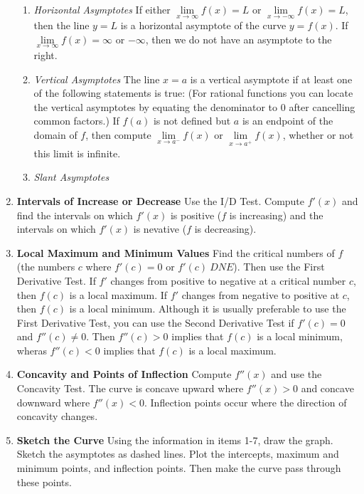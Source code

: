 \documentclass{article}
\begin{document}
\begin{enumerate}[leftmargin=5pt, labelindent=16pt]
		\begin{enumerate}[label=(\roman*)]
		\item \textit{Horizontal Asymptotes} \: If either $\underset{x \rightarrow \infty}{\lim} f(x) = L$ or  $\underset{x \rightarrow -\infty}{\lim} f(x) = L$, then the line $y=L$ is a horizontal asymptote of the curve $y=f(x)$. If $\underset{x \rightarrow \infty}{\lim} f(x) = \infty$ or $-\infty$, then we do not have an asymptote to the right. \vspace{5pt}
		\item \textit{Vertical Asymptotes} \: The line $x=a$ is a vertical asymptote if at least one of the following statements is true: (For rational functions you can locate the vertical asymptotes by equating the denominator to $0$ after cancelling common factors.) If $f(a)$ is not defined but $a$ is an endpoint of the domain of $f$, then compute  $\underset{x \rightarrow a^-}{\lim} f(x)$ or  $\underset{x \rightarrow a^+}{\lim} f(x)$, whether or not this limit is infinite. \vspace{5pt}
		\item \textit{Slant Asymptotes}\\
		\end{enumerate}
	\item \textbf{Intervals of Increase or Decrease} \: Use the I/D Test. Compute $f'(x)$ and find the intervals on which $f'(x)$ is positive ($f$ is increasing) and the intervals on which $f'(x)$ is nevative ($f$ is decreasing). \\
	\item \textbf{Local Maximum and Minimum Values} \: Find the critical numbers of $f$ (the numbers $c$ where $f'(c)=0$ or $f'(c) \: DNE$). Then use the First Derivative Test. If $f'$ changes from positive to negative at a critical number $c$, then $f(c)$ is a local maximum. If $f'$ changes from negative to positive at $c$, then $f(c)$ is a local minimum. Although it is usually preferable to use the First Derivative Test, you can use the Second Derivative Test if $f'(c) = 0$ and $f''(c) \ne 0$. Then $f''(c) > 0$ implies that $f(c)$ is a local minimum, wheras $f''(c)<0$ implies that $f(c)$ is a local maximum. \\
	\item \textbf{Concavity and Points of Inflection} \: Compute $f''(x)$ and use the Concavity Test. The curve is concave upward where $f''(x) > 0$ and concave downward where $f''(x) < 0$. Inflection points occur where the direction of concavity changes. \\
	\item \textbf{Sketch the Curve} \: Using the information in items 1-7, draw the graph. Sketch the asymptotes as dashed lines. Plot the intercepts, maximum and minimum points, and inflection points. Then make the curve pass through these points.	
\end{enumerate}
\pagebreak
\end{document}
